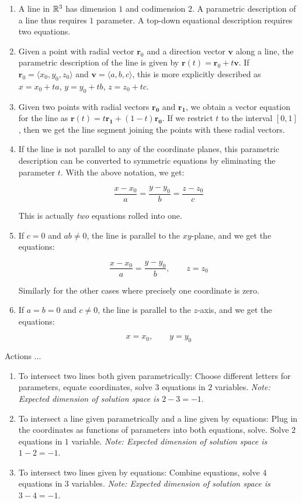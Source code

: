 \documentclass[10pt]{amsart}
\begin{document}
\begin{enumerate}
\item A line in $\mathbb{R}^3$ has dimension $1$ and codimension $2$. A
  parametric description of a line thus requires $1$ parameter. A
  top-down equational description requires two equations.
\item Given a point with radial vector $\mathbf{r}_0$ and a direction
  vector $\mathbf{v}$ along a line, the parametric description of the
  line is given by $\mathbf{r}(t) = \mathbf{r}_0 + t\mathbf{v}$. If
  $\mathbf{r}_0 = \langle x_0, y_0,z_0 \rangle$ and $\mathbf{v} =
  \langle a,b,c \rangle$, this is more explicitly described as $x =
  x_0 + ta$, $y = y_0 + tb$, $z = z_0 + tc$.
\item Given two points with radial vectors $\mathbf{r_0}$ and
  $\mathbf{r_1}$, we obtain a vector equation for the line as
  $\mathbf{r}(t) = t\mathbf{r_1} + (1 - t)\mathbf{r_0}$. If we
  restrict $t$ to the interval $[0,1]$, then we get the line segment
  joining the points with these radial vectors.
\item If the line is not parallel to any of the coordinate planes,
  this parametric description can be converted to symmetric equations
  by eliminating the parameter $t$. With the above notation, we get:

  $$\frac{x - x_0}{a} = \frac{y - y_0}{b} = \frac{z - z_0}{c}$$

  This is actually {\em two} equations rolled into one.

\item If $c = 0$ and $ab \ne 0$, the line is parallel to
  the $xy$-plane, and we get the equations:

  $$\frac{x - x_0}{a} = \frac{y - y_0}{b}, \qquad z = z_0$$

  Similarly for the other cases where precisely one coordinate is zero.
\item If $a = b = 0$ and $c \ne 0$, the line is parallel to the
  $z$-axis, and we get the equations:

  $$x = x_0, \qquad y = y_0$$
\end{enumerate}

Actions ...

\begin{enumerate}
\item To intersect two lines both given parametrically: Choose
  different letters for parameters, equate coordinates, solve $3$
  equations in $2$ variables. {\em Note: Expected dimension of
  solution space is $2 - 3 = -1$}.
\item To intersect a line given parametrically and a line given by
  equations: Plug in the coordinates as functions of parameters into
  both equations, solve. Solve $2$ equations in $1$ variable. {\em
  Note: Expected dimension of solution space is $1 - 2 = -1$}.
\item To intersect two lines given by equations: Combine equations,
  solve $4$ equations in $3$ variables. {\em Note: Expected dimension
  of solution space is $3 - 4 = -1$}.
\end{enumerate}
\end{document}
